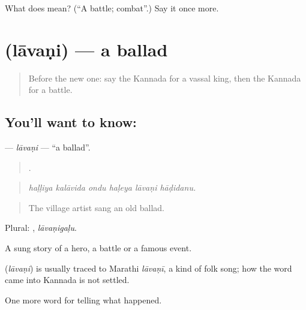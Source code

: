 \begin{tcolorbox}[breakable,colback=teal!4,colframe=teal!35!black,title={Before you move on}]
What does  mean? (\textquotedblleft{}A battle; combat\textquotedblright{}.) Say it once more.
\end{tcolorbox}
\section[\texorpdfstring{\kn{ಲಾವಣಿ} (lāvaṇi)}{ಲಾವಣಿ (lāvaṇi)}]{ (lāvaṇi) — a ballad}

\label{lesson:KA-C356-lavani}



\begin{quote}
Before the new one: say the Kannada for a vassal king, then the Kannada for a battle.
\end{quote}

\subsection*{You'll want to know: }
\textbf{} — \emph{lāvaṇi} — \textquotedblleft{}a ballad\textquotedblright{}.

\begin{quote}
     .
\end{quote}

\begin{quote}
\emph{haḷḷiya kalāvida ondu haḷeya lāvaṇi hāḍidanu.}
\end{quote}

\begin{quote}
The village artist sang an old ballad.
\end{quote}

Plural: , \emph{lāvaṇigaḷu}.

A sung story of a hero, a battle or a famous event.

\begin{cousinweb}
\textbf{} (\emph{lāvaṇi}) is usually traced to Marathi \emph{lāvaṇī}, a kind of folk song; how the word came into Kannada is not settled.
\end{cousinweb}

\begin{grammarlens}[title={What you've built}]
One more word for telling what happened.
\end{grammarlens}

